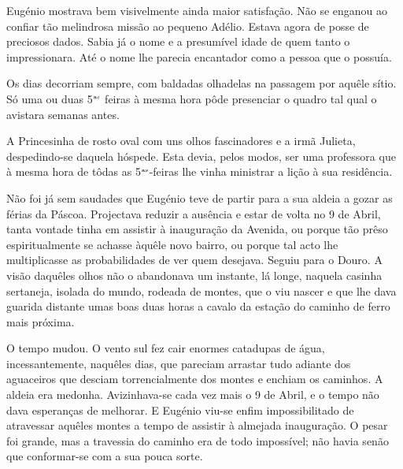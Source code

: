 \documentclass[9pt]{article}
\begin{document}
Eugé\-nio mostrava bem visivelmente ainda maior satisfa\-ção. Não se enganou ao confiar tão melindrosa missão ao pequeno Adélio. Estava agora
de posse de preciosos dados. Sabia já o nome e a presumível idade de
quem tanto o impressionara. Até o nome lhe parecia encantador como a
pessoa que o possuía.

Os dias decorriam sempre, com baldadas o\-lhadelas na passagem por a\-quê\-le sítio. Só uma ou duas 5$^{\mbox{\tiny as}}$ feiras à mesma hora pôde presenciar o
quadro tal qual o avistara semanas antes.

A Princesinha de rosto oval com uns o\-lhos fascinadores e a irmã
Julieta, despedindo-se daquela hóspede. Esta devia, pelos modos, ser uma
professora que à mesma hora de tôdas as 5$^{\mbox{\tiny as}}$-feiras lhe vinha ministrar
a li\-ção à sua residên\-cia.

Não foi já sem saudades que Eugé\-nio teve de partir para a sua aldeia
a gozar as férias da Páscoa. Projectava reduzir a ausência e estar
de volta no 9 de Abril, tanta vontade tinha em assistir à inaugura\-ção
da Avenida, ou porque tão prêso espiritualmente se achasse à\-quê\-le novo
bairro, ou porque tal acto lhe multiplicasse as probabilidades de ver
quem desejava. Seguiu para o Douro. A visão da\-quê\-les o\-lhos não o abandonava um instante, lá longe, naquela casinha sertaneja, isolada do mundo, rodeada de
montes, que o viu nascer e que lhe dava guarida distante umas boas duas
horas a cavalo da esta\-ção do caminho de ferro mais próxima.

O tempo mudou. O vento sul fez cair enormes catadupas de água,
incessantemente, na\-quê\-les dias, que pareciam arrastar tudo adiante dos
aguaceiros que desciam torrencialmente dos montes e enchiam os caminhos. A aldeia era medonha. Avizinhava-se cada vez mais o 9 de Abril,
e o tempo não dava esperan\-ças de me\-lhorar. E Eugé\-nio viu-se enfim impossibilitado de atravessar a\-quê\-les montes a tempo de assistir à almejada inaugura\-ção. O pesar foi gran\-de, mas a travessia do caminho era
de todo impossível; não havia senão que conformar-se com a sua pouca
sorte.
\end{document}
